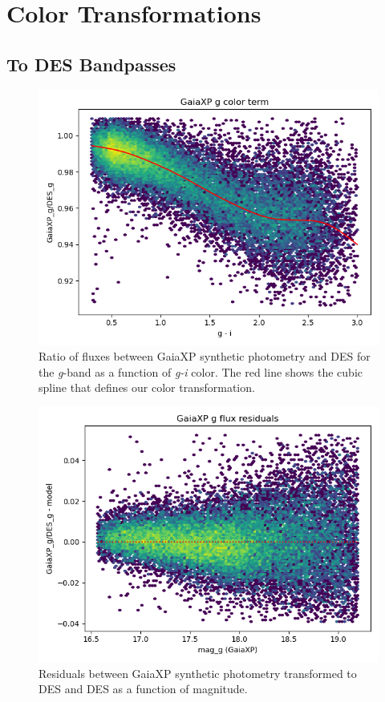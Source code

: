 \section{Color Transformations}
\subsection{To DES Bandpasses}
\begin{figure}
    \centering
    \includegraphics[width=\linewidth]{./figures/color_terms/GaiaXP_to_DES_band_g_color_term.png}
    \caption{Ratio of fluxes between GaiaXP synthetic photometry and DES for the \textit{g}-band as a function of \textit{g-i} color. The red line shows the cubic spline that defines our color transformation.}
    \label{xp-to-des-g-colorterm}
\end{figure}

\begin{figure}
    \centering
    \includegraphics[width=\linewidth]{./figures/color_terms/GaiaXP_to_DES_band_g_flux_residuals.png}
    \caption{Residuals between GaiaXP synthetic photometry transformed to DES and DES as a function of magnitude.}
    \label{xp-to-des-g-residual}
\end{figure}

